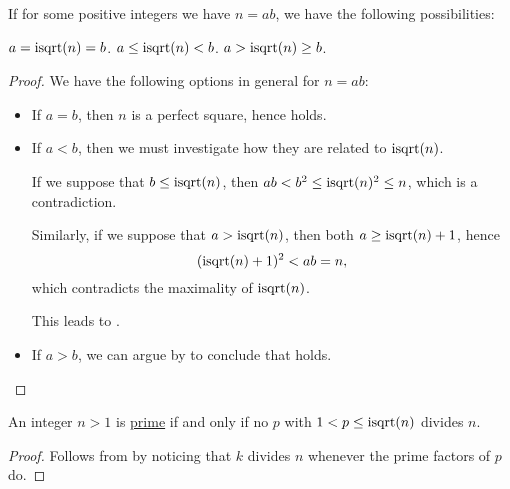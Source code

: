\begin{proposition}\label{thm:int_sqrt_leq}
  If for some positive integers we have \( n = ab \), we have the following possibilities:
  \begin{thmenum}
     \( a = \op{isqrt}(n) = b \).
     \( a \leq \op{isqrt}(n) < b \).
     \( a > \op{isqrt}(n) \geq b \).
  \end{thmenum}
\end{proposition}
\begin{proof}
  We have the following options in general for \( n = ab \):
  \begin{itemize}
    \item If \( a = b \), then \( n \) is a perfect square, hence  holds.
    \item If \( a < b \), then we must investigate how they are related to \( \op{isqrt}(n) \).

    If we suppose that \( b \leq \op{isqrt}(n) \), then \( ab < b^2 \leq \op{isqrt}(n)^2 \leq n \), which is a contradiction.

    Similarly, if we suppose that \( a > \op{isqrt}(n) \), then both \( a \geq \op{isqrt}(n) + 1 \), hence
    \begin{equation*}
      (\op{isqrt}(n) + 1)^2 < ab = n,
    \end{equation*}
    which contradicts the maximality of \( \op{isqrt}(n) \).

    This leads to .

    \item If \( a > b \), we can argue by  to conclude that  holds.
  \end{itemize}
\end{proof}

\begin{corollary}\label{thm:prime_number_sqrt_prime}
  An integer \( n > 1 \) is \hyperref[def:prime_number]{prime} if and only if no  \( p \) with \( 1 < p \leq \op{isqrt}(n) \) divides \( n \).
\end{corollary}
\begin{proof}
  Follows from  by noticing that \( k \) divides \( n \) whenever the prime factors of \( p \) do.
\end{proof}

